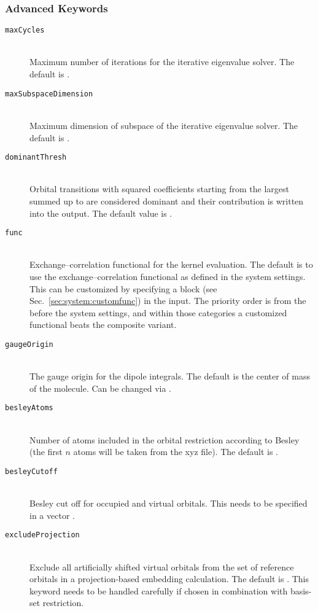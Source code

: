 \subsubsection{Advanced Keywords}
\begin{description}
    \item [\texttt{maxCycles}]\hfill \\
    Maximum number of iterations for the iterative eigenvalue solver. The default is .
    \item [\texttt{maxSubspaceDimension}]\hfill \\
    Maximum dimension of subspace of the iterative eigenvalue solver. The default is .
    \item [\texttt{dominantThresh}]\hfill \\
    Orbital transitions with squared coefficients starting from the largest summed up to  are considered dominant and their contribution is written into the output. The default value is .
    \item [\texttt{func}]\hfill \\
    Exchange--correlation functional for the kernel evaluation. The default is to use the exchange--correlation functional as defined in the system settings. This can be customized by specifying a  block (see Sec.~\ref{sec:system:customfunc}) in the  input. The priority order is  from the  before the system settings, and within those categories a customized functional beats the composite variant.
    \item [\texttt{gaugeOrigin}]\hfill \\
    The gauge origin for the dipole integrals. The default is the center of mass of the molecule. Can be changed via .
    \item [\texttt{besleyAtoms}]\hfill \\
    Number of atoms included in the orbital restriction according to Besley (the first $n$ atoms will be taken from the xyz file). The default is .
    \item [\texttt{besleyCutoff}]\hfill \\
    Besley cut off for occupied and virtual orbitals. This needs to be specified in a vector .
    \item [\texttt{excludeProjection}]\hfill \\
    Exclude all artificially shifted virtual orbitals from the set of reference orbitals in a projection-based embedding calculation. The default is . This keyword needs to be handled carefully if chosen in combination with basis-set restriction.

\end{description}
